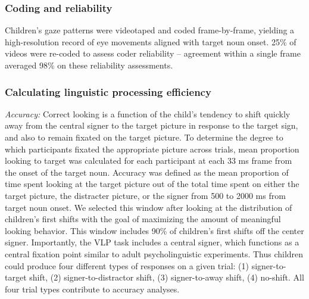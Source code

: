 \documentclass[12pt,]{article}
\begin{document}
\subsubsection{Coding and reliability}\label{coding-and-reliability}

Children's gaze patterns were videotaped and coded frame-by-frame,
yielding a high-resolution record of eye movements aligned with target
noun onset. 25\% of videos were re-coded to assess coder reliability --
agreement within a single frame averaged 98\% on these reliability
assessments.

\subsubsection{Calculating linguistic processing
efficiency}\label{calculating-linguistic-processing-efficiency}

\emph{Accuracy:} Correct looking is a function of the child's tendency
to shift quickly away from the central signer to the target picture in
response to the target sign, and also to remain fixated on the target
picture. To determine the degree to which participants fixated the
appropriate picture across trials, mean proportion looking to target was
calculated for each participant at each 33 ms frame from the onset of
the target noun. Accuracy was defined as the mean proportion of time
spent looking at the target picture out of the total time spent on
either the target picture, the distracter picture, or the signer from
500 to 2000 ms from target noun onset. We selected this window after
looking at the distribution of children's first shifts with the goal of
maximizing the amount of meaningful looking behavior. This window
includes 90\% of children's first shifts off the center signer.
Importantly, the VLP task includes a central signer, which functions as
a central fixation point similar to adult psycholinguistic experiments.
Thus children could produce four different types of responses on a given
trial: (1) signer-to-target shift, (2) signer-to-distractor shift, (3)
signer-to-away shift, (4) no-shift. All four trial types contribute to
accuracy analyses.
\end{document}
